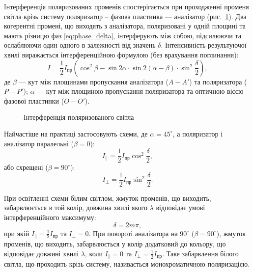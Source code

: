 Інтерференція поляризованих променів спостерігається при
проходженні променя світла крізь систему поляризатор – фазова пластинка
--- аналізатор (рис.~\ref{pic:Interferention_of_polarized}). Два когерентні промені, що виходять з аналізатора, поляризовані у одній площині та мають різницю фаз \eqref{eq:phase_delta}, інтерферують між собою, підсилюючи та ослаблюючи один одного в залежності від значень $ \delta $. Інтенсивність результуючої хвилі виражається інтерференційною формулою (без врахування поглинання):
\begin{equation}\label{eq:Interferention_of_polarized}
    I = \frac12 I_\text{пр} \left( \cos^2\beta - \sin2\alpha \cdot \sin2(\alpha-\beta)\cdot\sin^2\frac\delta2\right),
\end{equation}
де $ \beta $ --- кут між площинами пропускання аналізатора ($A - A'$) та поляризатора ($P - P'$); $ \alpha $ --- кут між площиною пропускання поляризатора та оптичною віссю фазової пластинки ($ O - O' $).


\begin{figure}[h!]\centering

\caption{Інтерференція поляризованого світла}
\label{pic:Interferention_of_polarized}
\end{figure}

Найчастіше на практиці застосовують схеми, де $ \alpha = 45^\circ $, а
поляризатор і аналізатор паралельні ($ \beta = 0 $):
\begin{equation}\label{}
    I_\parallel = \frac12 I_\text{пр} \cos^2\frac\delta2,
\end{equation}
або схрещені ($ \beta = 90^\circ $):
\begin{equation}\label{eq:I_perp}
    I_\perp = \frac12 I_\text{пр} \sin^2\frac\delta2.
\end{equation}

При освітленні схеми білим світлом, жмуток променів, що виходить,
забарвлюється в той колір, довжина хвилі якого $ \lambda $ відповідає умові
інтерференційного максимуму:
\begin{equation}\label{}
    \delta = 2m\pi,
\end{equation}
при якій $ I_\parallel = \frac12 I_\text{пр} $ та $I_\perp = 0$. При повороті аналізатора на $ 90^\circ $ ($ \beta = 90^\circ $), жмуток
променів, що виходить, забарвлюється у колір додатковий до кольору, що
відповідає довжині хвилі $ \lambda $, коли $ I_\parallel = 0 $ та $I_\perp = \frac12 I_\text{пр}$. Таке забарвлення білого світла, що проходить крізь систему, називається монохроматичною поляризацією.





